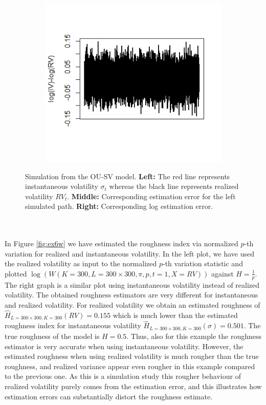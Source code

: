\documentclass{article}
\begin{document}
\begin{figure}[h]
\begin{subfigure}{0.32\textwidth}
    \end{subfigure}\hfill
    \begin{subfigure}{0.32\textwidth}
        \centering
        \includegraphics[width=\textwidth]{ex6_IVRV3.jpeg}
    \end{subfigure}
    \caption{Simulation from the OU-SV model. \textbf{Left:} The red line represents instantaneous volatility $\sigma_t$ whereas the black line represents realized volatility $RV_t$. \textbf{Middle:} Corresponding estimation error for the left simulated path. \textbf{Right:} Corresponding log estimation error.}
    \label{fig:example}
\end{figure}\\\\
In Figure \ref{fig:ex6w} we have estimated the roughness index via normalized $p$-th variation for realized and instantaneous volatility. In the left plot, we have used the realized volatility as input to the normalized $p$-th variation statistic and plotted $\log(W(K=300, L= 300\times 300, \pi, p, t=1, X = RV))$ against $H=\frac{1}{p}$. The right graph is a similar plot using instantaneous volatility instead of realized volatility. The obtained roughness estimators are very different for instantaneous and realized volatility. For realized volatility we obtain an estimated roughness of $\hat{H}_{L=300\times 300, K=300}(RV)=0.155$ which is much lower than the estimated roughness index for instantaneous volatility $\hat{H}_{L=300\times 300, K=300}(\sigma)=0.501$. The true roughness of the model is $H=0.5$. Thus, also for this example the roughness estimator is very accurate when using instantaneous volatility. However, the estimated roughness when using realized volatility is much rougher than the true roughness, and realized variance appear even rougher in this example compared to the previous one. As this is a simulation study this rougher behaviour of realized volatility purely comes from the estimation error, and this illustrates how estimation errors can substantially distort the roughness estimate.
\end{document}
